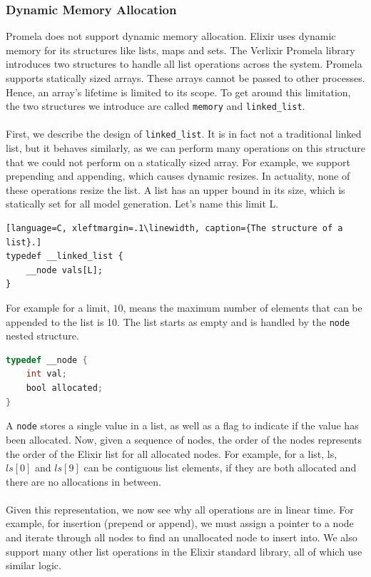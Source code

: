 \subsubsection{Dynamic Memory Allocation}
Promela does not support dynamic memory allocation. Elixir uses dynamic memory for its structures like lists, maps and sets. The Verlixir Promela library introduces two structures to handle all list operations across the system. Promela supports statically sized arrays. These arrays cannot be passed to other processes. Hence, an array's lifetime is limited to its scope. To get around this limitation, the two structures we introduce are called \texttt{memory} and \texttt{linked\_list}.
\\ \\
First, we describe the design of \texttt{linked\_list}. It is in fact not a traditional linked list, but it behaves similarly, as we can perform many operations on this structure that we could not perform on a statically sized array. For example, we support prepending and appending, which causes dynamic resizes. In actuality, none of these operations resize the list. A list has an upper bound in its size, which is statically set for all model generation. Let's name this limit L.
\begin{lstlisting}[language=C, xleftmargin=.1\linewidth, caption={The structure of a list}.]
typedef __linked_list {
    __node vals[L];
}
\end{lstlisting}
For example for a limit, $10$, means the maximum number of elements that can be appended to the list is 10. The list starts as empty and is handled by the \texttt{node} nested structure.
\begin{lstlisting}[language=C, xleftmargin=.1\linewidth, caption={Example of a list node typed `int'.}]
typedef __node {
    int val;
    bool allocated;
}
\end{lstlisting}
A \texttt{node} stores a single value in a list, as well as a flag to indicate if the value has been allocated. Now, given a sequence of nodes, the order of the nodes represents the order of the Elixir list for all allocated nodes. For example, for a list, ls, $ls[0]$ and $ls[9]$ can be contiguous list elements, if they are both allocated and there are no allocations in between.
\\ \\
Given this representation, we now see why all operations are in linear time. For example, for insertion (prepend or append), we must assign a pointer to a node and iterate through all nodes to find an unallocated node to insert into. We also support many other list operations in the Elixir standard library, all of which use similar logic.
